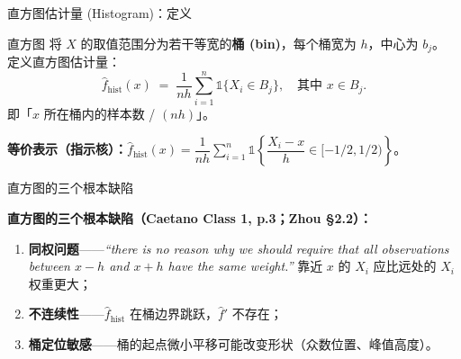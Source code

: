 \documentclass[aspectratio=169, 10pt]{beamer}
\begin{document}
\begin{frame}{直方图估计量 (Histogram)：定义}

  \begin{definitionbox}{直方图}
    将 $X$ 的取值范围分为若干等宽的\textbf{桶 (bin)}，每个桶宽为 $h$，中心为 $b_j$。
    定义直方图估计量：
    \[
      \hat f_{\text{hist}}(x) \;=\; \frac{1}{nh}\sum_{i=1}^n \mathds{1}\{X_i \in B_j\},\quad \text{其中 } x\in B_j.
    \]
    即「$x$ 所在桶内的样本数 / $(nh)$」。
  \end{definitionbox}

  \textbf{等价表示（指示核）：}$\hat f_{\text{hist}}(x) = \dfrac{1}{nh}\sum_{i=1}^n \mathds{1}\!\left\{\dfrac{X_i-x}{h}\in[-1/2,1/2)\right\}$。

\end{frame}


\begin{frame}{直方图的三个根本缺陷}

  \begin{highlightbox}
    \textbf{直方图的三个根本缺陷（Caetano Class 1, p.3；Zhou §2.2）：}
    \begin{enumerate}
      \item \textbf{同权问题}——\textcolor{negative}{\textit{``there is no reason why we should require that all observations between $x-h$ and $x+h$ have the same weight.''}} 靠近 $x$ 的 $X_i$ 应比远处的 $X_i$ 权重更大；
      \item \textbf{不连续性}——$\hat f_{\text{hist}}$ 在桶边界跳跃，$\hat f'$ 不存在；
      \item \textbf{桶定位敏感}——桶的起点微小平移可能改变形状（众数位置、峰值高度）。
    \end{enumerate}
  \end{highlightbox}

\end{frame}
\end{document}

